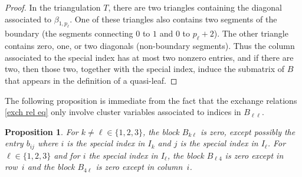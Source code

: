 \documentclass{amsart}
\newtheorem{proposition}{Proposition}[section]
\theoremstyle{definition}
\theoremstyle{remark}
\numberwithin{equation}{section}
\newcommand{\set}[1]{{\lbrace #1 \rbrace}}
\newcommand{\0}{{\mathbf{0}}}
\begin{document}
\begin{proof}
In the triangulation $T$, there are two triangles containing the diagonal associated to $\beta_{1,p_\ell}$.
One of these triangles also contains two segments of the boundary (the segments connecting $0$ to $1$ and $0$ to $p_\ell+2$).
The other triangle contains zero, one, or two diagonals (non-boundary segments).
Thus the column associated to the special index has at most two nonzero entries, and if there are two, then those two, together with the special index, induce the submatrix of $B$ that appears in the definition of a quasi-leaf.
\end{proof}

The following proposition is immediate from the fact that the exchange relations \eqref{exch rel eq} only involve cluster variables associated to indices in $B_{\ell\ell}$.

\begin{proposition}\label{mostly zeros}
For  $k\neq\ell\in\set{1,2,3}$, the block $B_{k\ell}$ is zero, except possibly the entry $b_{ij}$ where $i$ is the special index in $I_k$ and $j$ is the special index in $I_\ell$.
For $\ell\in\set{1,2,3}$ and for $i$ the special index in $I_\ell$, the block $B_{\ell4}$ is zero except in row~$i$ and the block $B_{4\ell}$ is zero except in column~$i$.
\end{proposition}
\end{document}
